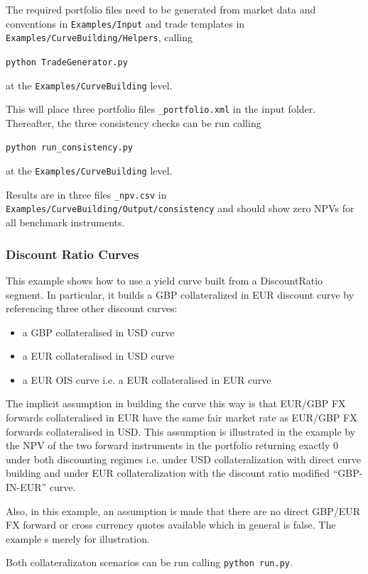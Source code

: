 \medskip
The required portfolio files need to be generated from market data and conventions in
{\tt Examples/Input} and trade templates in 
{\tt Examples/CurveBuilding/Helpers}, calling

\medskip
\centerline{\tt python TradeGenerator.py} at the {\tt Examples/CurveBuilding} level.

\medskip
This will place three portfolio files {\tt *\_portfolio.xml} in the input folder.
Thereafter, the three consistency checks can be run calling

\medskip
\centerline{\tt python run\_consistency.py} at the {\tt Examples/CurveBuilding} level.

\medskip
Results are in three files {\tt *\_npv.csv} in {\tt Examples/CurveBuilding/Output/consistency}
and should show zero NPVs for all benchmark instruments.

\subsubsection{Discount Ratio Curves}

This example shows how to use a yield curve built from a DiscountRatio segment. 
In particular, it builds a GBP collateralized in EUR discount curve by referencing 
three other discount curves:
\begin{itemize}
\item a GBP collateralised in USD curve
\item a EUR collateralised in USD curve
\item a EUR OIS curve i.e. a EUR collateralised in EUR curve
\end{itemize}

The implicit assumption in building the curve this way is that EUR/GBP FX 
forwards collateralised in EUR have the same fair market rate as EUR/GBP 
FX forwards collateralised in USD. This assumption is illustrated in the 
example by the NPV of the two forward instruments in the portfolio returning 
exactly 0 under both discounting regimes i.e. under USD collateralization with 
direct curve building and under EUR collateralization with the discount ratio 
modified ``GBP-IN-EUR'' curve.

Also, in this example, an assumption is made that there are no direct GBP/EUR FX 
forward or cross currency quotes available which in general is false. The example 
s merely for illustration.

Both collateralizaton scenarios can be run calling {\tt python run.py}.

